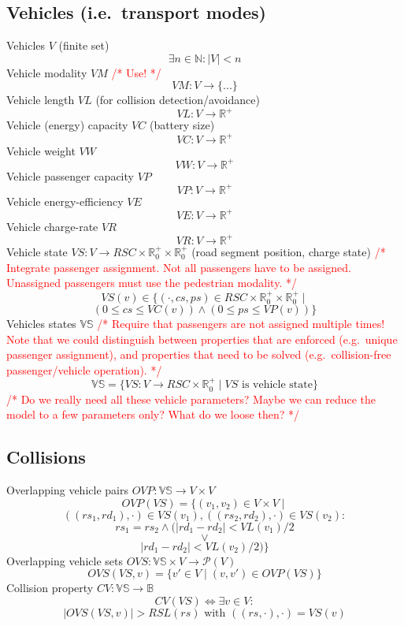\documentclass[conference]{IEEEtran}
\newcommand{\todo}[1]{\textcolor{red}{/* #1 */}}
\begin{document}
	\subsection{Vehicles (i.e.\ transport modes)}
	\label{vehicles}
	
	Vehicles $V$ (finite set)
	\[
		\exists n \in \mathbb{N} : |V| < n
	\]
	Vehicle modality $VM$ \todo{Use!}
	\[
		VM: V \rightarrow \{...\}
	\]
	Vehicle length $VL$ (for collision detection/avoidance)
	\[
		VL : V \rightarrow \mathbb{R}^+
	\]
	Vehicle (energy) capacity $VC$ (battery size)
	\[
		VC : V \rightarrow \mathbb{R}^+
	\]
	Vehicle weight $VW$
	\[
		VW : V \rightarrow \mathbb{R}^+
	\]
	Vehicle passenger capacity $VP$
	\[
		VP : V \rightarrow \mathbb{R}^+
	\]
	Vehicle energy-efficiency $VE$ 
		\[
		VE : V \rightarrow \mathbb{R}^+
	\]
	Vehicle charge-rate $VR$ 
		\[
		VR : V \rightarrow \mathbb{R}^+
	\]
	Vehicle state $VS : V \rightarrow RSC \times \mathbb{R}_0^+ \times \mathbb{R}_0^+$ (road segment position, charge state) \todo{Integrate passenger assignment. Not all passengers have to be assigned. Unassigned passengers must use the pedestrian modality.}
	\[
		VS(v) \in \{ (\cdot, cs, ps) \in RSC \times \mathbb{R}_0^+ \times \mathbb{R}_0^+ \mid
	\]
	\[
		(0 \leq cs \leq VC(v)) \wedge (0 \leq ps \leq VP(v)) \}
	\]
	Vehicles states $\mathbb{VS}$ \todo{Require that passengers are not assigned multiple times! Note that we could distinguish between properties that are enforced (e.g.\ unique passenger assignment), and properties that need to be solved (e.g.\ collision-free passenger/vehicle operation).}
	\[
		\mathbb{VS} = \{VS : V \rightarrow RSC \times \mathbb{R}_0^+ \mid VS \text{ is vehicle state}\}
	\]
	\todo{Do we really need all these vehicle parameters? Maybe we can reduce the model to a few parameters only? What do we loose then?}
	
	\subsection{Collisions}
	\label{collisions}
	
	Overlapping vehicle pairs $OVP : \mathbb{VS} \rightarrow V \times V$
	\[
		OVP(VS) = \{(v_1, v_2) \in V \times V \mid
	\]
	\[
		((rs_1,rd_1),\cdot) \in VS(v_1), ((rs_2,rd_2),\cdot) \in VS(v_2) :
	\]
	\[
		rs_1 = rs_2 \wedge (|rd_1 - rd_2| < VL(v_1) / 2
	\]
	\[
		\vee
	\]
	\[
		|rd_1 - rd_2| < VL(v_2) / 2)\}
	\]
	Overlapping vehicle sets $OVS : \mathbb{VS} \times V \rightarrow \mathcal{P}(V)$
	\[
		OVS(VS,v) = \{v' \in V \mid (v, v') \in OVP(VS)\}
	\]
	Collision property $CV : \mathbb{VS} \rightarrow \mathbb{B}$
	\[
		CV(VS) \Leftrightarrow \exists v \in V :
	\]
	\[
		|OVS(VS, v)| > RSL(rs) \text{ with } ((rs,\cdot),\cdot) = VS(v)
	\]
	
\end{document}
